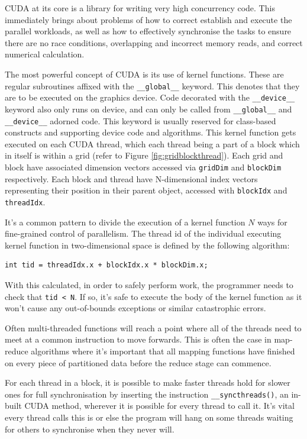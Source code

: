 \documentclass[conference]{IEEEtran}
\begin{document}
CUDA at its core is a library for writing very high concurrency code. This immediately brings about problems of how to correct establish and execute the parallel workloads, as well as how to effectively synchronise the tasks to ensure there are no race conditions, overlapping and incorrect memory reads, and correct numerical calculation.

The most powerful concept of CUDA is its use of kernel functions. These are regular subroutines affixed with the \texttt{\_\_global\_\_} keyword. This denotes that they are to be executed on the graphics device. Code decorated with the \texttt{\_\_device\_\_} keyword also only runs on device, and can only be called from \texttt{\_\_global\_\_} and \texttt{\_\_device\_\_} adorned code. This keyword is usually reserved for class-based constructs and supporting device code and algorithms. This kernel function gets executed on each CUDA thread, which each thread being a part of a block which in itself is within a grid (refer to Figure \ref{fig:gridblockthread}). Each grid and block have associated dimension vectors accessed via \texttt{gridDim} and \texttt{blockDim} respectively. Each block and thread have N-dimensional index vectors representing their position in their parent object, accessed with \texttt{blockIdx} and \texttt{threadIdx}.

It's a common pattern to divide the execution of a kernel function $N$ ways for fine-grained control of parallelism. The thread id of the individual executing kernel function in two-dimensional space is defined by the following algorithm:

\begin{lstlisting}[breaklines]
int tid = threadIdx.x + blockIdx.x * blockDim.x; 
\end{lstlisting}

With this calculated, in order to safely perform work, the programmer needs to check that \verb|tid < N|. If so, it's safe to execute the body of the kernel function as it won't cause any out-of-bounds exceptions or similar catastrophic errors.

Often multi-threaded functions will reach a point where all of the threads need to meet at a common instruction to move forwards. This is often the case in map-reduce algorithms where it's important that all mapping functions have finished on every piece of partitioned data before the reduce stage can commence.

For each thread in a block, it is possible to make faster threads hold for slower ones for full synchronisation by inserting the instruction \texttt{\_\_syncthreads()}, an in-built CUDA method, wherever it is possible for every thread to call it. It's vital every thread calls this is or else the program will hang on some threads waiting for others to synchronise when they never will.
\end{document}
